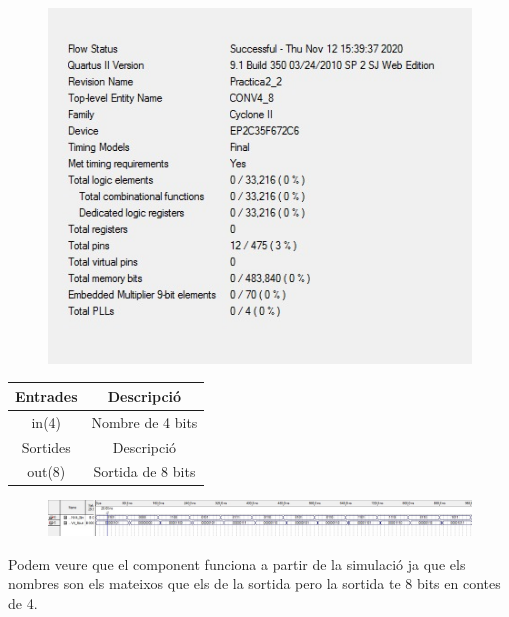 \documentclass[12pt, a4papre]{article}
\begin{document}
	\begin{figure}[H]
		\begin{center}
		\includegraphics[width=130mm]{informeCONV4_8.jpeg}
		\end{center}
	\end{figure}
	
	\begin{table}[h!]
		\centering
		 \begin{tabular}{|c | c|} 
			 \hline
			 Entrades & Descripció\\ [0.5ex] 
			 \hline
			 in(4) &  Nombre de 4 bits\\ 
			 \hline\hline
			 Sortides & Descripció\\ [0.5ex] 
			 \hline
			 out(8) & Sortida de 8 bits\\ 
			 \hline
		 \end{tabular}
	\end{table}
	
	\begin{figure}[H]
		\begin{center}
		\includegraphics[width=130mm]{4_8Simulacio.jpeg}
		\end{center}
	\end{figure}
	
	Podem veure que el component funciona a partir de la simulació ja que els nombres son els mateixos que els de la sortida pero la sortida te 8 bits en contes de 4.
	
\end{document}
